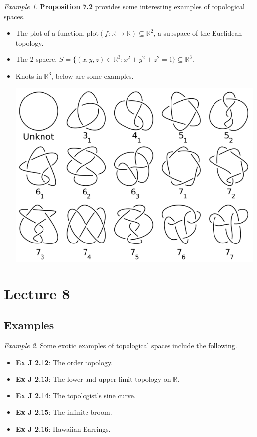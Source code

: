 \documentclass[ 12pt ]{article}
\newcounter{lecture_num}
\theoremstyle{plain}
\theoremstyle{plain}
\theoremstyle{definition}
\theoremstyle{remark}
\newtheorem*{example*}{Example}
\begin{document}
\begin{example*}
	\textbf{Proposition 7.2} provides some interesting examples of topological spaces.
	\begin{itemize}
		\item The plot of a function, $\mathrm{plot}( f : \mathbb{R} \to \mathbb{R} ) \subseteq \mathbb{R}^2$, a subspace of the Euclidean topology.
		\item The 2-sphere, $S = \{ (x, y, z) \in \mathbb{R}^3 : x^2 + y^2 + z^2 = 1 \} \subseteq \mathbb{R}^3$.
		\item Knots in $\mathbb{R}^3$, below are some examples.
			\begin{center}
				\includegraphics{Capture}
			\end{center}
	\end{itemize}
\end{example*}


\setcounter{lecture_num}{8}
\setcounter{theorem}{0}
\section*{Lecture 8}

\subsection*{Examples}

\begin{example*}
	Some exotic examples of topological spaces include the following.
	\begin{itemize}
		\item \textbf{Ex J 2.12}: The order topology.
		\item \textbf{Ex J 2.13}: The lower and upper limit topology on $\mathbb{R}$.
		\item \textbf{Ex J 2.14}: The topologist's sine curve.
		\item \textbf{Ex J 2.15}: The infinite broom.
		\item \textbf{Ex J 2.16}: Hawaiian Earrings.
	\end{itemize}
\end{example*}
\end{document}
